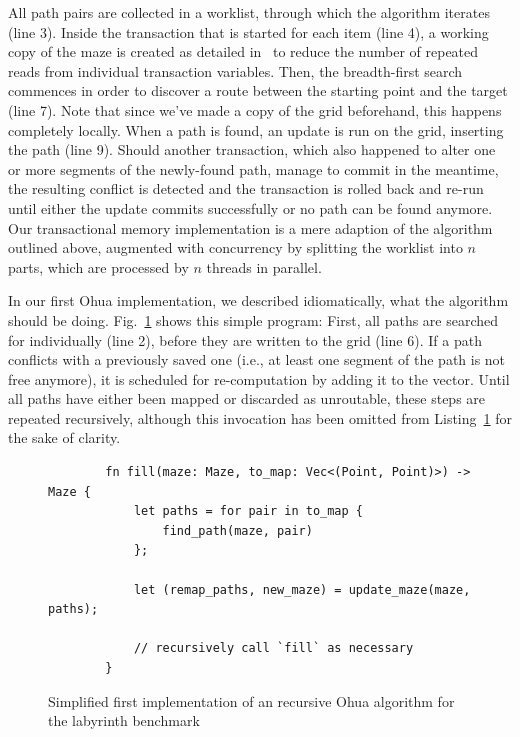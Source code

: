 All path pairs are collected in a worklist, through which the algorithm iterates (line 3).
Inside the transaction that is started for each item (line 4), a working copy of the maze is created as detailed in~\cite{swalens2016transactional} to reduce the number of repeated reads from individual transaction variables.
Then, the breadth-first search commences in order to discover a route between the starting point and the target (line 7).
Note that since we've made a copy of the grid beforehand, this happens completely locally.
When a path is found, an update is run on the grid, inserting the path (line 9).
Should another transaction, which also happened to alter one or more segments of the newly-found path, manage to commit in the meantime, the resulting conflict is detected and the transaction is rolled back and re-run until either the update commits successfully or no path can be found anymore.
Our transactional memory implementation is a mere adaption of the algorithm outlined above, augmented with concurrency by splitting the worklist into $n$ parts, which are processed by $n$ threads in parallel.

In our first Ohua implementation, we described idiomatically, what the algorithm should be doing.
Fig.~\ref{fig:preliminaries:ohua1} shows this simple program: First, all paths are searched for individually (line 2), before they are written to the grid (line 6).
If a path conflicts with a previously saved one (i.e., at least one segment of the path is not free anymore), it is scheduled for re-computation by adding it to the  vector.
Until all paths have either been mapped or discarded as unroutable, these steps are repeated recursively, although this invocation has been omitted from Listing~\ref{fig:preliminaries:ohua1} for the sake of clarity.

\begin{figure}[t]
    \begin{verbatim}
        fn fill(maze: Maze, to_map: Vec<(Point, Point)>) -> Maze {
            let paths = for pair in to_map {
                find_path(maze, pair)
            };

            let (remap_paths, new_maze) = update_maze(maze, paths);

            // recursively call `fill` as necessary
        }
    \end{verbatim}
    \caption{Simplified first implementation of an recursive Ohua algorithm for the labyrinth benchmark}%
    \label{fig:preliminaries:ohua1}
\end{figure}

